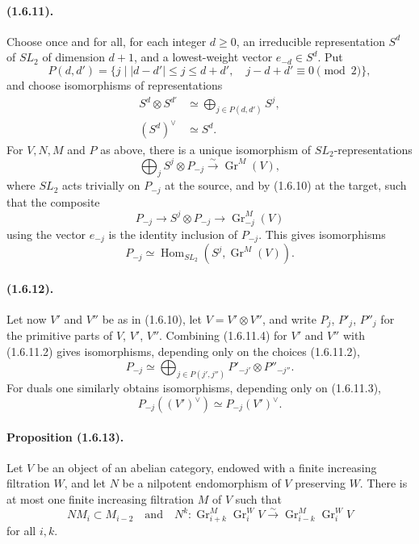 \documentclass[11pt]{article}
\theoremstyle{remark}
\newcommand{\Hom}{\operatorname{Hom}}
\newcommand{\Gr}{\operatorname{Gr}}
\begin{document}
\paragraph{(1.6.11).} Choose once and for all, for each integer $d\ge0$, an irreducible representation $S^d$ of $SL_2$ of dimension $d+1$, and a lowest-weight vector $e_{-d}\in S^d$. Put
\[
        P(d,d')=\{j\mid |d-d'|\le j\le d+d',\quad j-d+d'\equiv0\pmod2\},
\]
and choose isomorphisms of representations
\begin{align}
        S^d\otimes S^{d'}&\simeq \bigoplus_{j\in P(d,d')}S^j,\tag{1.6.11.2}\\
        (S^d)^\vee&\simeq S^d.\tag{1.6.11.3}
\end{align}
For $V,N,M$ and $P$ as above, there is a unique isomorphism of $SL_2$-representations
\begin{equation}\tag{1.6.11.4}
        \bigoplus_j S^j\otimes P_{-j}\xrightarrow{\sim}\Gr^M(V),
\end{equation}
where $SL_2$ acts trivially on $P_{-j}$ at the source, and by (1.6.10) at the target, such that the composite
\[
        P_{-j}\longrightarrow S^j\otimes P_{-j}\longrightarrow \Gr^M_{-j}(V)
\]
using the vector $e_{-j}$ is the identity inclusion of $P_{-j}$. This gives isomorphisms
\begin{equation}\tag{1.6.11.5}
        P_{-j}\simeq \Hom_{SL_2}(S^j,\Gr^M(V)).
\end{equation}

\paragraph{(1.6.12).} Let now $V'$ and $V''$ be as in (1.6.10), let $V=V'\otimes V''$, and write $P_j$, $P'_j$, $P''_j$ for the primitive parts of $V$, $V'$, $V''$. Combining (1.6.11.4) for $V'$ and $V''$ with (1.6.11.2) gives isomorphisms, depending only on the choices (1.6.11.2),
\begin{equation}\tag{1.6.12.1}
        P_{-j}\simeq
        \bigoplus_{j\in P(j',j'')} P'_{-j'}\otimes P''_{-j''}.
\end{equation}
For duals one similarly obtains isomorphisms, depending only on (1.6.11.3),
\begin{equation}\tag{1.6.12.2}
        P_{-j}((V')^\vee)\simeq P_{-j}(V')^\vee.
\end{equation}

\paragraph{Proposition (1.6.13).} Let $V$ be an object of an abelian category, endowed with a finite increasing filtration $W$, and let $N$ be a nilpotent endomorphism of $V$ preserving $W$. There is at most one finite increasing filtration $M$ of $V$ such that
\[
        NM_i\subset M_{i-2}
        \quad\text{and}\quad
        N^k:\Gr^M_{i+k}\Gr^W_iV\xrightarrow{\sim}\Gr^M_{i-k}\Gr^W_iV
\]
for all $i,k$.
\end{document}
